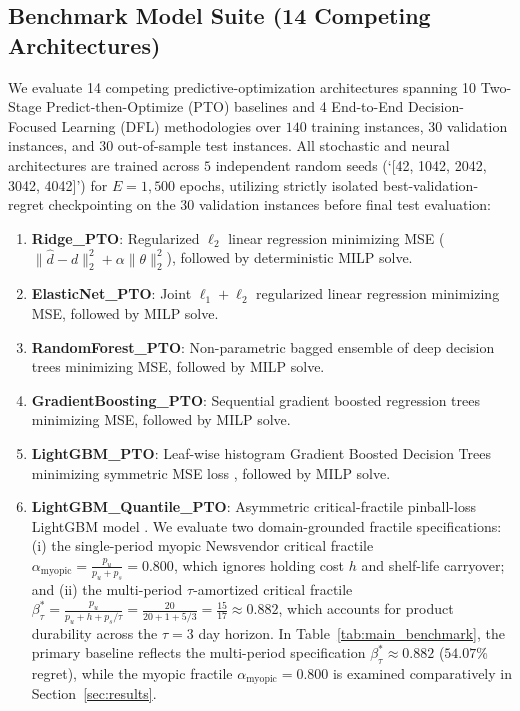 \documentclass[11pt,a4paper]{article}
\theoremstyle{definition}
\theoremstyle{remark}
\begin{document}
\subsection{Benchmark Model Suite (14 Competing Architectures)}
\label{subsec:models}
We evaluate 14 competing predictive-optimization architectures spanning 10 Two-Stage Predict-then-Optimize (PTO) baselines and 4 End-to-End Decision-Focused Learning (DFL) methodologies over $140$ training instances, $30$ validation instances, and $30$ out-of-sample test instances. All stochastic and neural architectures are trained across $5$ independent random seeds (`[42, 1042, 2042, 3042, 4042]') for $E = 1,500$ epochs, utilizing strictly isolated best-validation-regret checkpointing on the 30 validation instances before final test evaluation:
\begin{enumerate}[label=\arabic*.]
    \item \textbf{Ridge\_PTO}: Regularized $\ell_2$ linear regression minimizing MSE ($\|\hat{d} - d\|_2^2 + \alpha \|\theta\|_2^2$), followed by deterministic MILP solve.
    \item \textbf{ElasticNet\_PTO}: Joint $\ell_1 + \ell_2$ regularized linear regression minimizing MSE, followed by MILP solve.
    \item \textbf{RandomForest\_PTO}: Non-parametric bagged ensemble of deep decision trees minimizing MSE, followed by MILP solve.
    \item \textbf{GradientBoosting\_PTO}: Sequential gradient boosted regression trees minimizing MSE, followed by MILP solve.
    \item \textbf{LightGBM\_PTO}: Leaf-wise histogram Gradient Boosted Decision Trees minimizing symmetric MSE loss \citep{ke2017lightgbm}, followed by MILP solve.
    \item \textbf{LightGBM\_Quantile\_PTO}: Asymmetric critical-fractile pinball-loss LightGBM model \citep{ke2017lightgbm}. We evaluate two domain-grounded fractile specifications: (i) the single-period myopic Newsvendor critical fractile $\alpha_{\text{myopic}} = \frac{p_u}{p_u + p_s} = 0.800$, which ignores holding cost $h$ and shelf-life carryover; and (ii) the multi-period $\tau$-amortized critical fractile $\beta_\tau^* = \frac{p_u}{p_u + h + p_s/\tau} = \frac{20}{20 + 1 + 5/3} = \frac{15}{17} \approx 0.882$, which accounts for product durability across the $\tau=3$ day horizon. In Table~\ref{tab:main_benchmark}, the primary baseline reflects the multi-period specification $\beta_\tau^* \approx 0.882$ ($54.07\%$ regret), while the myopic fractile $\alpha_{\text{myopic}} = 0.800$ is examined comparatively in Section~\ref{sec:results}.

\end{enumerate}
\end{document}
